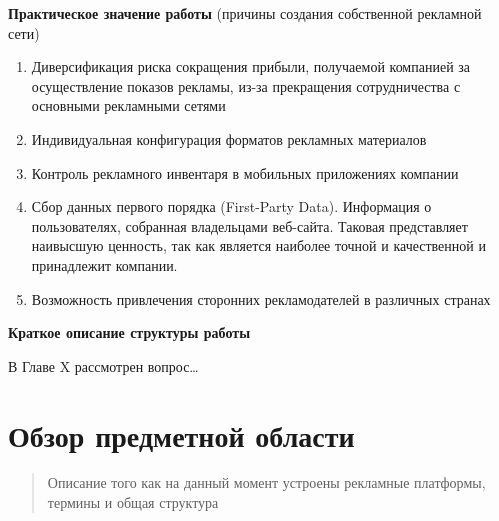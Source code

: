 \documentclass[specification,annotation,times]{itmo-student-thesis}
\begin{document}
\bigbreak
{\large \textbf{Практическое значение работы}} (причины создания собственной рекламной сети)
\bigbreak

\begin{enumerate}
	\item Диверсификация риска сокращения прибыли, получаемой компанией за осуществление показов рекламы, из-за прекращения сотрудничества с основными рекламными сетями
	\item Индивидуальная конфигурация форматов рекламных материалов
	\item Контроль рекламного инвентаря в мобильных приложениях компании
	\item Сбор данных первого порядка (First-Party Data). Информация о пользователях, собранная владельцами веб-сайта. Таковая представляет наивысшую ценность, так как является наиболее точной и качественной и принадлежит компании.
	\item Возможность привлечения сторонних рекламодателей в различных странах
\end{enumerate}
\bigbreak


\bigbreak
{\large \textbf{Краткое описание структуры работы}}
\bigbreak

В Главе X рассмотрен вопрос…








\chapter{Обзор предметной области}


\startrelatedwork %

\begin{quotation}
  Описание того как на данный момент устроены рекламные платформы, термины и общая структура
\end{quotation}
\end{document}
